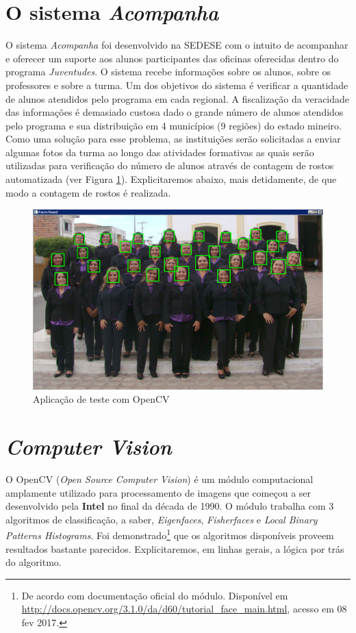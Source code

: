 \documentclass[a4paper, 12pt, openright, oneside, english, brazil, article]{abntex2}
\begin{document}
	\section*{O sistema \textit{Acompanha}}
	
	O sistema \textit{Acompanha} foi desenvolvido na SEDESE com o intuito de acompanhar e oferecer um suporte aos alunos participantes das oficinas oferecidas dentro do programa \textit{Juventudes}. O sistema recebe informações sobre os alunos, sobre os professores e sobre a turma. Um dos objetivos do sistema é verificar a quantidade de alunos atendidos pelo programa em cada regional. A fiscalização da veracidade das informações é demasiado custosa dado o grande número de alunos atendidos pelo programa e sua distribuição em 4 municípios (9 regiões) do estado mineiro. Como uma solução para esse problema, as instituições serão solicitadas a enviar algumas fotos da turma ao longo das atividades formativas as quais serão utilizadas para verificação do número de alunos através de contagem de rostos automatizada (ver Figura \ref{face_class}). Explicitaremos abaixo, mais detidamente, de que modo a contagem de rostos é realizada.
	
	\begin{figure}[!h]
		\centering
		\caption{Aplicação de teste com OpenCV}
		\label{face_class}
		\includegraphics[scale=.45]{face_reco1.png}
	\end{figure}
	
	\section*{\textit{Computer Vision}}
	
	O OpenCV (\textit{Open Source Computer Vision}) é um módulo computacional amplamente utilizado para processamento de imagens que começou a ser desenvolvido pela \textbf{Intel} no final da década de 1990. O módulo trabalha com 3 algoritmos de classificação, a saber, \textit{Eigenfaces}, \textit{Fisherfaces} e \textit{Local Binary Patterns Histograms}. Foi demonstrado\footnote{De acordo com documentação oficial do módulo. Disponível em \url{http://docs.opencv.org/3.1.0/da/d60/tutorial_face_main.html}, acesso em 08 fev 2017.} que os algoritmos disponíveis proveem resultados bastante parecidos. Explicitaremos, em linhas gerais, a lógica por trás do algoritmo.
	
\end{document}
